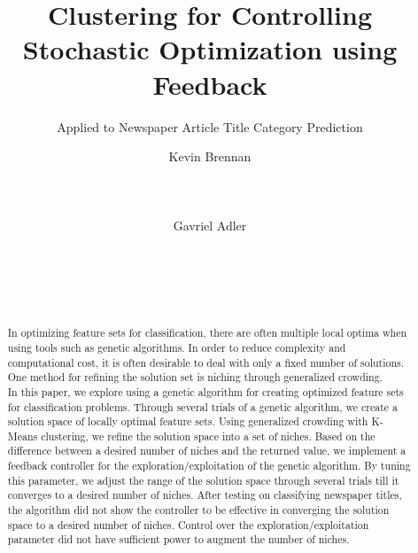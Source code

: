 \documentclass{sig-alternate}
\begin{document}
%

\title{Clustering for Controlling Stochastic Optimization using Feedback}
\subtitle{Applied to Newspaper Article Title Category Prediction}

\author{
\alignauthor
Kevin Brennan\\
       \\
       \\
       \\
\alignauthor
Gavriel Adler\\
       \\
       \\
       \\
       \\
}


\maketitle
\begin{abstract}
In optimizing feature sets for classification, there are often multiple local optima when using tools such as genetic algorithms. In order to reduce complexity and computational cost, it is often desirable to deal with only a fixed number of solutions. One method for refining the solution set is niching through generalized crowding.\\
\indent In this paper, we explore using a genetic algorithm for creating optimized feature sets for classification problems. Through several trials of a genetic algorithm, we create a solution space of locally optimal feature sets. Using generalized crowding with K-Means clustering, we refine the solution space into a set of niches. Based on the difference between a desired number of niches and the returned value, we implement a feedback controller for the exploration/exploitation of the genetic algorithm. By tuning this parameter, we adjust the range of the solution space through several trials till it converges to a desired number of niches. After testing on classifying newspaper titles, the algorithm did not show the controller to be effective in converging the solution space to a desired number of niches. Control over the exploration/exploitation parameter did not have sufficient power to augment the number of niches.
\end{abstract}
\end{document}
